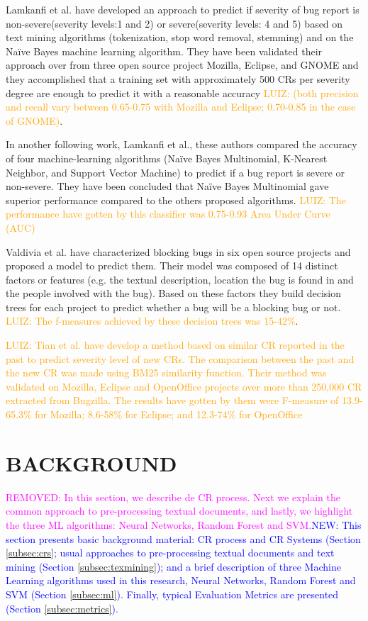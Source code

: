 \documentclass[10pt, conference]{IEEEtran}
\newcommand{\luiz}[1]{\noindent\textcolor{orange}{LUIZ: {#1}}}
\newcommand{\rem}[1]{\noindent\textcolor{magenta}{REMOVED: {#1}}}
\newcommand{\new}[1]{\noindent\textcolor{blue}{NEW: {#1}}}
\newcommand{\luiz}[1]{}
\newcommand{\rem}[1]{}
\newcommand{\new}[1]{#1}
\begin{document}
Lamkanfi et al.\cite{Lamkanfi2010} have developed an approach to predict if severity of bug report is non-severe(severity levels:1 and 2) or severe(severity levels: 4 and 5) based on text mining algorithms (tokenization, stop word removal, stemming) and on the Naïve Bayes machine learning algorithm. They have been validated their approach over from three open source project Mozilla, Eclipse, and GNOME and they accomplished that a training set with approximately 500 CRs per severity degree are enough to predict it with a reasonable accuracy
\luiz{(both precision and recall vary between 0.65-0.75 with Mozilla and Eclipse; 0.70-0.85 in the case of GNOME)}.

 In another following work, Lamkanfi et al.\cite{Lamkanfi2011}, these authors compared the accuracy of four machine-learning algorithms (Naïve Bayes Multinomial, K-Nearest Neighbor, and Support Vector Machine) to predict if a bug report is severe or non-severe. They have been concluded that Naïve Bayes Multinomial gave superior performance compared to the others proposed algorithms. \luiz{The performance have gotten by this classifier was 0.75-0.93 Area Under Curve (AUC)}

Valdivia et al.\cite{ValdiviaGarcia2014} have characterized blocking bugs in six open source projects and proposed a model to predict them. Their model was composed of 14 distinct factors or features (e.g. the textual description, location the bug is found in and the people involved with the bug). Based on these factors they build decision trees for each project to predict whether a bug will be a blocking bug or not. \luiz{The f-measures achieved by these decision trees was 15-42\%}.

\luiz{Tian et al.\cite{Tian2012} have develop a method based on similar CR reported in the past to predict severity level of new CRs. The comparison between the past and the new CR was made using BM25 similarity function. Their method was validated on Mozilla, Eclipse and OpenOffice projects over more than 250,000 CR extracted from Bugzilla. The results have gotten by them were F-measure of 13.9-65.3\% for Mozilla; 8.6-58\% for Eclipse; and 12.3-74\% for OpenOffice}  


\section{BACKGROUND} \label{sec:background} 
\rem{In this section, we describe de CR process. Next we explain the common approach to pre-processing textual documents, and lastly, we highlight the three ML algorithms: Neural Networks, Random Forest and SVM.}\new{This section presents basic background material: CR process and CR Systems (Section \ref{subsec:crs}; usual approaches to pre-processing textual documents and text mining (Section \ref{subsec:texmining}); and a brief description of three Machine Learning algorithms used in this research, Neural Networks, Random Forest and SVM (Section \ref{subsec:ml}). Finally, typical Evaluation Metrics are presented (Section \ref{subsec:metrics}). }
\end{document}

